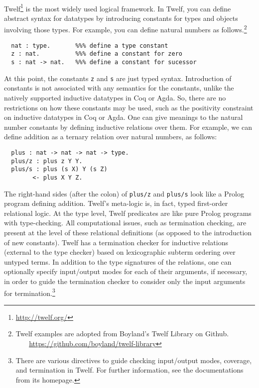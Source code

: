 \paragraph{}
Twelf\footnote{\url{http://twelf.org/}} is the most widely used
logical framework. In Twelf, you can define abstract syntax for datatypes
by introducing constants for types and objects involving those types.
For example, you can define natural numbers as follows.\footnote{
        Twelf examples are adopted from Boyland's Twelf Library on Github.\\
        $~~~~~~~$
        \url{https://github.com/boyland/twelf-library}}\vspace*{-2em}
\begin{singlespace}
\begin{verbatim}
  nat : type.       %%% define a type constant
  z : nat.          %%% define a constant for zero
  s : nat -> nat.   %%% define a constant for sucessor
\end{verbatim}
\end{singlespace}\noindent
At this point, the constants \texttt{z} and \texttt{s} are just typed syntax.
Introduction of constants is not associated with any semantics for
the constants, unlike the natively supported inductive datatypes
in Coq or Agda. So, there are no restrictions on how these constants
may be used, such as the positivity constraint on inductive datatypes
in Coq or Agda. One can give meanings to the natural number constants
by defining inductive relations over them. For example, we can define
addition as a ternary relation over natural numbers, as follows:\vspace*{-2em}
\begin{singlespace}
\begin{verbatim}
  plus : nat -> nat -> nat -> type.
  plus/z : plus z Y Y.
  plus/s : plus (s X) Y (s Z)
        <- plus X Y Z.
\end{verbatim}
\end{singlespace}\noindent
The right-hand sides (after the colon) of \verb|plus/z| and \verb|plus/s|
look like a Prolog program defining addition. Twelf's meta-logic is, in fact,
typed first-order relational logic. At the type level, Twelf predicates are
like pure Prolog programs with type-checking. All computational issues,
such as termination checking, are present at the level of these
relational definitions (as opposed to the introduction of new constants).
Twelf has a termination checker for inductive relations (external to
the type checker) based on lexicographic subterm ordering over untyped terms.
In addition to the type signatures of the relations, one can optionally specify
input/output modes for each of their arguments, if necessary, in order to guide
the termination checker to consider only the input arguments
for termination.\footnote{There are various directives to guide
        checking input/output modes, coverage, and termination in Twelf.
        For further information, see the  documentations from its homepage.}

